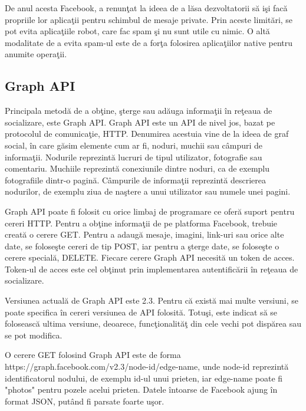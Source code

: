 	De anul acesta Facebook, a renun\c{t}at la ideea de a l\u{a}sa dezvoltatorii s\u{a} i\c{s}i fac\u{a} propriile lor aplica\c{t}ii pentru schimbul de mesaje private. Prin aceste limit\u{a}ri, se pot evita aplica\c{t}iile robot, care fac spam \c{s}i nu sunt utile cu nimic. O alt\u{a} modalitate de a evita spam-ul este de a for\c{t}a folosirea aplica\c{t}iilor native pentru anumite opera\c{t}ii.
\subsection{Graph API}
	Principala metod\u{a} de a ob\c{t}ine, \c{s}terge sau ad\u{a}uga informa\c{t}ii \^{i}n re\c{t}eaua de socializare, este Graph API. Graph API este un API de nivel jos, bazat pe protocolul de comunica\c{t}ie, HTTP. Denumirea acestuia vine de la ideea de graf social, \^{i}n care g\u{a}sim elemente cum ar fi, noduri, muchii sau c\^{a}mpuri de informa\c{t}ii. Nodurile reprezint\u{a} lucruri de tipul utilizator, fotografie sau comentariu. Muchiile reprezint\u{a} conexiunile dintre noduri, ca de exemplu fotografiile dintr-o pagin\u{a}. C\^{a}mpurile de informa\c{t}ii reprezint\u{a} descrierea nodurilor, de exemplu ziua de na\c{s}tere a unui utilizator sau numele unei pagini.
	
	Graph API poate fi folosit cu orice limbaj de programare ce ofer\u{a} suport pentru cereri HTTP. Pentru a ob\c{t}ine informa\c{t}ii de pe platforma Facebook, trebuie creat\u{a} o cerere GET. Pentru a adaug\u{a} mesaje, imagini, link-uri sau orice alte date, se folose\c{s}te cereri de tip POST, iar pentru a \c{s}terge date, se folose\c{s}te o cerere special\u{a}, DELETE. Fiecare cerere Graph API necesit\u{a} un token de acces. Token-ul de acces este cel ob\c{t}inut prin implementarea autentific\u{a}rii \^{i}n re\c{t}eaua de socializare.
	
	Versiunea actual\u{a} de Graph API este 2.3. Pentru c\u{a} exist\u{a} mai multe versiuni, se poate specifica \^{i}n cereri versiunea de API folosit\u{a}. Totu\c{s}i, este indicat s\u{a} se foloseasc\u{a} ultima versiune, deoarece, func\c{t}ionalit\u{a}\c{t} din cele vechi pot disp\u{a}rea sau se pot modifica.	

	O cerere GET folosind Graph API este de forma https://graph.facebook.com/v2.3/{node-id}/{edge-name}, unde node-id reprezint\u{a} identificatorul nodului, de exemplu id-ul unui prieten, iar edge-name poate fi "photos" pentru pozele acelui prieten. Datele \^{i}ntoarse de Facebook ajung \^{i}n format JSON, put\^{a}nd fi parsate foarte u\c{s}or.
	
